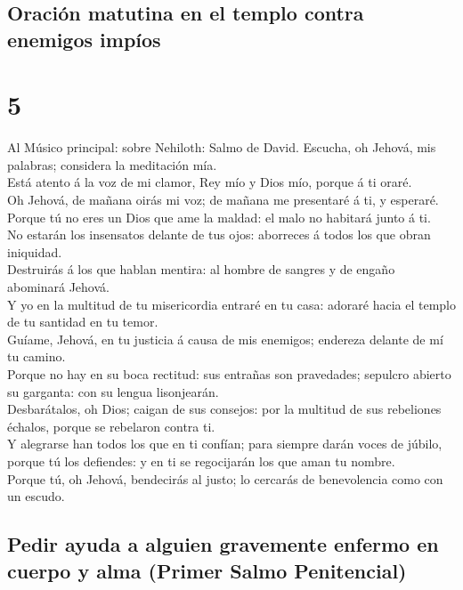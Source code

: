 \hypertarget{oraciuxf3n-matutina-en-el-templo-contra-enemigos-impuxedos}{%
\subsection{Oración matutina en el templo contra enemigos
impíos}\label{oraciuxf3n-matutina-en-el-templo-contra-enemigos-impuxedos}}

\hypertarget{section-4}{%
\section{5}\label{section-4}}

 Al Músico principal: sobre Nehiloth: Salmo de David.
Escucha, oh Jehová, mis palabras; considera la meditación mía.\\
 Está atento á la voz de mi clamor, Rey mío y Dios mío,
porque á ti oraré.\\
 Oh Jehová, de mañana oirás mi voz; de mañana me
presentaré á ti, y esperaré.\\
 Porque tú no eres un Dios que ame la maldad: el malo no
habitará junto á ti.\\
 No estarán los insensatos delante de tus ojos: aborreces
á todos los que obran iniquidad.\\
 Destruirás á los que hablan mentira: al hombre de sangres
y de engaño abominará Jehová.\\
 Y yo en la multitud de tu misericordia entraré en tu
casa: adoraré hacia el templo de tu santidad en tu temor.\\
 Guíame, Jehová, en tu justicia á causa de mis enemigos;
endereza delante de mí tu camino.\\
 Porque no hay en su boca rectitud: sus entrañas son
pravedades; sepulcro abierto su garganta: con su lengua lisonjearán.\\
 Desbarátalos, oh Dios; caigan de sus consejos: por la
multitud de sus rebeliones échalos, porque se rebelaron contra ti.\\
 Y alegrarse han todos los que en ti confían; para
siempre darán voces de júbilo, porque tú los defiendes: y en ti se
regocijarán los que aman tu nombre.\\
 Porque tú, oh Jehová, bendecirás al justo; lo cercarás
de benevolencia como con un escudo.

\hypertarget{pedir-ayuda-a-alguien-gravemente-enfermo-en-cuerpo-y-alma-primer-salmo-penitencial}{%
\subsection{Pedir ayuda a alguien gravemente enfermo en cuerpo y alma
(Primer Salmo
Penitencial)}\label{pedir-ayuda-a-alguien-gravemente-enfermo-en-cuerpo-y-alma-primer-salmo-penitencial}}

